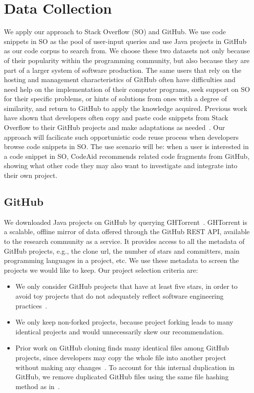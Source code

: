 \section{Data Collection}
\label{sec:dataset}
We apply our approach to Stack Overflow (SO) and GitHub. We use code snippets in SO as the pool of user-input queries and use Java projects in GitHub as our code corpus to search from. We choose these two datasets not only because of their popularity within the programming community, but also because they are part of a larger system of software production. The same users that rely on the hosting and management characteristics of GitHub often have difficulties and need help on the implementation of their computer programs, seek support on SO for their specific problems, or hints of solutions from ones with a degree of similarity, and return to GitHub to apply the knowledge acquired. Previous work have shown that developers often copy and paste code snippets from Stack Overflow to their GitHub projects and make adaptations as needed~\cite{yang2017stack, an2017stack, wu2018developers, zhang2019analyzing}. Our approach will facilicate such opportunistic code reuse process when developers browse code snippets in SO. The use scenario will be: when a user is interested in a code snippet in SO, CodeAid recommends related code fragments from GitHub, showing what other code they may also want to investigate and integrate into their own project. 


\subsection{GitHub}
We downloaded Java projects on GitHub by querying GHTorrent~\cite{gousios2012ghtorrent}. GHTorrent is a scalable, offline mirror of data offered through the GitHub REST API, available to the research community as a service. It provides access to all the metadata of GitHub projects, e.g., the clone url, the number of stars and committers, main programming languages in a project, etc. We use these metadata to screen the projects we would like to keep. Our project selection criteria are:
\begin{itemize}
	\item We only consider GitHub projects that have at least five stars, in order to avoid toy projects that do not adequately reflect software engineering practices~\cite{kalliamvakou2014promises}.
	\item We only keep non-forked projects, because project forking leads to many identical projects and would unnecessarily skew our recommendation.
	\item Prior work on GitHub cloning finds many identical files among GitHub projects, since developers may copy the whole file into another project without making any changes~\cite{lopes2017dejavu}. To account for this internal duplication in GitHub, we remove duplicated GitHub files using the same file hashing method as in~\cite{lopes2017dejavu}.
\end{itemize} 


